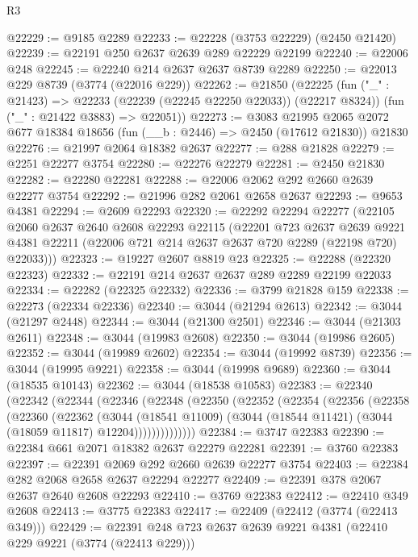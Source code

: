 \begin{lexlean}{R3}
\begin{coremodule}
@22229 := @9185 @2289
@22233 := @22228 (@3753 @22229) (@2450 @21420)
@22239 := @22191 @250 @2637 @2639 @289 @22229 @22199
@22240 := @22006 @248
@22245 := @22240 @214 @2637 @2637 @8739 @2289
@22250 := @22013 @229 @8739 (@3774 (@22016 @229))
@22262 := @21850
    (@22225
      (fun ("_" : @21423) => @22233 (@22239 (@22245 @22250 @22033)) (@22217 @8324))
      (fun ("_" : @21422 @3883) => @22051))
@22273 := @3083
    @21995
    @2065
    @2072
    @677
    @18384
    @18656
    (fun (__b : @2446) => @2450 (@17612 @21830))
    @21830
@22276 := @21997 @2064 @18382 @2637
@22277 := @288 @21828
@22279 := @2251 @22277 @3754
@22280 := @22276 @22279
@22281 := @2450 @21830
@22282 := @22280 @22281
@22288 := @22006 @2062 @292 @2660 @2639 @22277 @3754
@22292 := @21996 @282 @2061 @2658 @2637
@22293 := @9653 @4381
@22294 := @2609 @22293
@22320 := @22292
    @22294
    @22277
    (@22105
      @2060
      @2637
      @2640
      @2608
      @22293
      @22115
      (@22201
        @723
        @2637
        @2639
        @9221
        @4381
        @22211
        (@22006 @721 @214 @2637 @2637 @720 @2289 (@22198 @720) @22033)))
@22323 := @19227 @2607 @8819 @23
@22325 := @22288 (@22320 @22323)
@22332 := @22191 @214 @2637 @2637 @289 @2289 @22199 @22033
@22334 := @22282 (@22325 @22332)
@22336 := @3799 @21828 @159
@22338 := @22273 (@22334 @22336)
@22340 := @3044 (@21294 @2613)
@22342 := @3044 (@21297 @2448)
@22344 := @3044 (@21300 @2501)
@22346 := @3044 (@21303 @2611)
@22348 := @3044 (@19983 @2608)
@22350 := @3044 (@19986 @2605)
@22352 := @3044 (@19989 @2602)
@22354 := @3044 (@19992 @8739)
@22356 := @3044 (@19995 @9221)
@22358 := @3044 (@19998 @9689)
@22360 := @3044 (@18535 @10143)
@22362 := @3044 (@18538 @10583)
@22383 := @22340
    (@22342
      (@22344
        (@22346
          (@22348
            (@22350
              (@22352
                (@22354
                  (@22356
                    (@22358
                      (@22360
                        (@22362
                          (@3044
                            (@18541 @11009)
                            (@3044 (@18544 @11421) (@3044 (@18059 @11817) @12204))))))))))))))
@22384 := @3747 @22383
@22390 := @22384 @661 @2071 @18382 @2637 @22279 @22281
@22391 := @3760 @22383
@22397 := @22391 @2069 @292 @2660 @2639 @22277 @3754
@22403 := @22384 @282 @2068 @2658 @2637 @22294 @22277
@22409 := @22391 @378 @2067 @2637 @2640 @2608 @22293
@22410 := @3769 @22383
@22412 := @22410 @349 @2608
@22413 := @3775 @22383
@22417 := @22409 (@22412 (@3774 (@22413 @349)))
@22429 := @22391 @248 @723 @2637 @2639 @9221 @4381 (@22410 @229 @9221 (@3774 (@22413 @229)))

\end{coremodule}
\end{lexlean}
